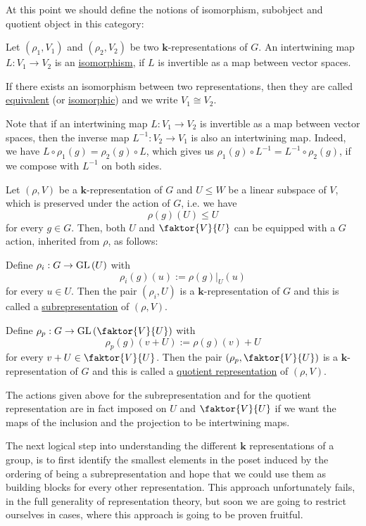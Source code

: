 At this point we should define the notions of isomorphism, subobject and quotient object in this category:

\begin{definition} Let $(\rho_1, V_1)$ and $(\rho_2, V_2)$ be two $\mathbf{k}$-representations of $G$. An intertwining map $L:V_1\to V_2$ is an \ul{isomorphism}, if $L$ is invertible as a map between vector spaces.

If there exists an isomorphism between two representations, then they are called \ul{equivalent} (or \ul{isomorphic}) and we write $V_1\cong V_2$.
\end{definition}

Note that if an intertwining map $L:V_1\to V_2$ is invertible as a map between vector spaces, then the inverse map $L^{-1}:V_2\to V_1$ is also an intertwining map. Indeed, we have $L\circ\rho_1(g)=\rho_2(g)\circ L$, which gives us $\rho_1(g)\circ L^{-1}=L^{-1}\circ\rho_2(g)$, if we compose with $L^{-1}$ on both sides.

\begin{definition} Let $(\rho, V)$ be a $\mathbf{k}$-representation of $G$ and $U\leq W$ be a linear subspace of $V$, which is preserved under the action of $G$, i.e. we have
$$\rho(g)(U)\leq U$$
for every $g\in G$. Then, both $U$ and $\faktor{V}{U}$ can be equipped with a $G$ action, inherited from $\rho$, as follows:
\begin{i_enum}
\item Define $\rho_i:G\to\GL{U}$ with
$$\rho_i(g)(u):=\rho(g)|_U(u)$$
for every $u\in U$. Then the pair $(\rho_i,U)$ is a $\mathbf{k}$-representation of $G$ and this is called a \ul{subrepresentation} of $(\rho,V)$.
\item Define $\rho_p:G\to\GL{\faktor{V}{U}}$ with
$$\rho_p(g)(v+U):=\rho(g)(v)+U$$
for every $v+U\in\faktor{V}{U}$. Then the pair $(\rho_p,\faktor{V}{U})$ is a $\mathbf{k}$-representation of $G$ and this is called a \ul{quotient representation} of $(\rho,V)$.
\end{i_enum}
\end{definition}

The actions given above for the subrepresentation and for the quotient representation are in fact imposed on $U$ and $\faktor{V}{U}$ if we want the maps of the inclusion and the projection to be intertwining maps.

The next logical step into understanding the different $\mathbf{k}$ representations of a group, is to first identify the smallest elements in the poset induced by the ordering of being a subrepresentation and hope that we could use them as building blocks for every other representation. This approach unfortunately fails, in the full generality of representation theory, but soon we are going to restrict ourselves in cases, where this approach is going to be proven fruitful.

